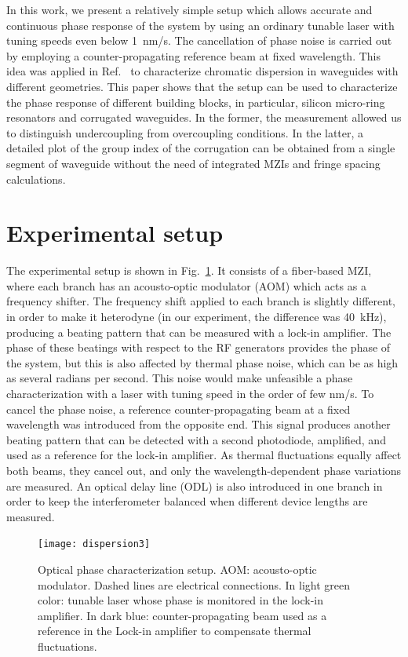 \documentclass[journal]{IEEEtran}
\begin{document}
In this work, we present a relatively simple setup which allows accurate and continuous phase response of the system by using an ordinary tunable laser with tuning speeds even below 1~nm/s.
The cancellation of phase noise is carried out by employing a counter-propagating reference beam at fixed wavelength.
This idea was applied in Ref.~\cite{Mas2012} to characterize chromatic dispersion in waveguides with different geometries.
This paper shows that the setup can be used to characterize the phase response of different building blocks, in particular, silicon micro-ring resonators and corrugated waveguides.
In the former, the measurement allowed us to distinguish undercoupling from overcoupling conditions.
In the latter, a detailed plot of the group index of the corrugation can be obtained from a single segment of waveguide without the need of integrated MZIs and fringe spacing calculations.


\section{Experimental setup}
The experimental setup is shown in Fig.~\ref{fig:dispersionSetup}.
It consists of a fiber-based MZI, where each branch has an acousto-optic modulator (AOM) which acts as a frequency shifter.
The frequency shift applied to each branch is slightly different, in order to make it heterodyne (in our experiment, the difference was 40~kHz), producing a beating pattern that can be measured with a lock-in amplifier.
The phase of these beatings with respect to the RF generators provides the phase of the system, but this is also affected by thermal phase noise, which can be as high as several radians per second.
This noise would make unfeasible a phase characterization with a laser with tuning speed in the order of few nm/s. To cancel the phase noise, a reference counter-propagating beam at a fixed wavelength was introduced from the opposite end.
This signal produces another beating pattern that can be detected with a second photodiode, amplified, and used as a reference for the lock-in amplifier.
As thermal fluctuations equally affect both beams, they cancel out, and only the wavelength-dependent phase variations are measured.
An optical delay line (ODL) is also introduced in one branch in order to keep the interferometer balanced when different device lengths are measured. 


\begin{figure}[htb]
	\centering
	\texttt{[image: dispersion3]}
	\caption{Optical phase characterization setup. AOM: acousto-optic modulator. Dashed lines are electrical connections. In light green color: tunable laser whose phase is monitored in the lock-in amplifier. In dark blue: counter-propagating beam used as a reference in the Lock-in amplifier to compensate thermal fluctuations.}
	\label{fig:dispersionSetup}
\end{figure}
\end{document}
